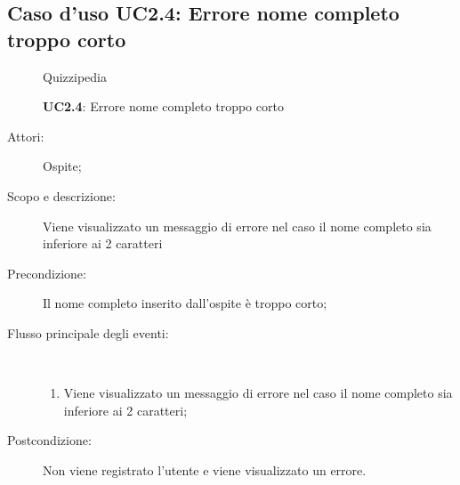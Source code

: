 \subsection{Caso d'uso UC2.4: Errore nome completo troppo corto}
	\begin{figure}[H]
		\centering
		\begin{resizedtikzpicture}{\textwidth}
		\begin{umlsystem}[x=0, fill=lightgray!20]{Quizzipedia}
		\end{umlsystem}
		\end{resizedtikzpicture}
		\caption{\textbf{UC2.4}: Errore nome completo troppo corto}
		\label{UC2.4}
	\end{figure}
\begin{description}
\item[Attori:] Ospite;
\item[Scopo e descrizione:] Viene visualizzato un messaggio di errore nel caso il nome completo sia inferiore ai 2 caratteri
      \item[Precondizione:] Il nome completo inserito dall'ospite è troppo corto;

        \item[Flusso principale degli eventi:] \ 
 \begin{enumerate}
          \item Viene visualizzato un messaggio di errore nel caso il nome completo sia inferiore ai 2 caratteri;

      \end{enumerate}
    \item[Postcondizione:] Non viene registrato l'utente e viene visualizzato un errore.
  \end{description}
\hypertarget{UC2.5}{}
